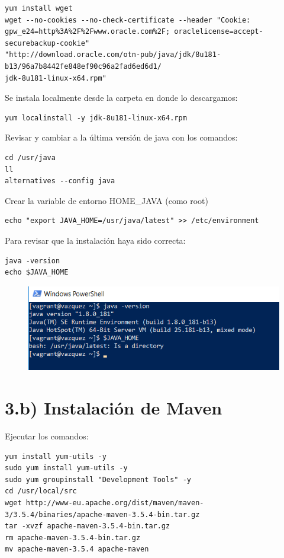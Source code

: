 \documentclass[]{article}
\begin{document}
\begin{verbatim}
yum install wget
wget --no-cookies --no-check-certificate --header "Cookie:
gpw_e24=http%3A%2F%2Fwww.oracle.com%2F; oraclelicense=accept-securebackup-cookie"
"http://download.oracle.com/otn-pub/java/jdk/8u181-b13/96a7b8442fe848ef90c96a2fad6ed6d1/
jdk-8u181-linux-x64.rpm"
\end{verbatim}

Se instala localmente desde la carpeta en donde lo descargamos:

\begin{verbatim}
yum localinstall -y jdk-8u181-linux-x64.rpm
\end{verbatim}

Revisar y cambiar a la última versión de java con los comandos:

\begin{verbatim}
cd /usr/java
ll
alternatives --config java
\end{verbatim}

Crear la variable de entorno HOME\_JAVA (como root)

\begin{verbatim}
echo "export JAVA_HOME=/usr/java/latest" >> /etc/environment
\end{verbatim}

Para revisar que la instalación haya sido correcta:

\begin{verbatim}
java -version
echo $JAVA_HOME
\end{verbatim}

\begin{figure}[htbp]
\centering
\includegraphics{java.png}
\end{figure}

\section{3.b) Instalación de Maven}\label{b-instalacion-de-maven}

Ejecutar los comandos:

\begin{verbatim}
yum install yum-utils -y
sudo yum install yum-utils -y
sudo yum groupinstall "Development Tools" -y
cd /usr/local/src
wget http://www-eu.apache.org/dist/maven/maven-3/3.5.4/binaries/apache-maven-3.5.4-bin.tar.gz
tar -xvzf apache-maven-3.5.4-bin.tar.gz 
rm apache-maven-3.5.4-bin.tar.gz 
mv apache-maven-3.5.4 apache-maven
\end{verbatim}
\end{document}
